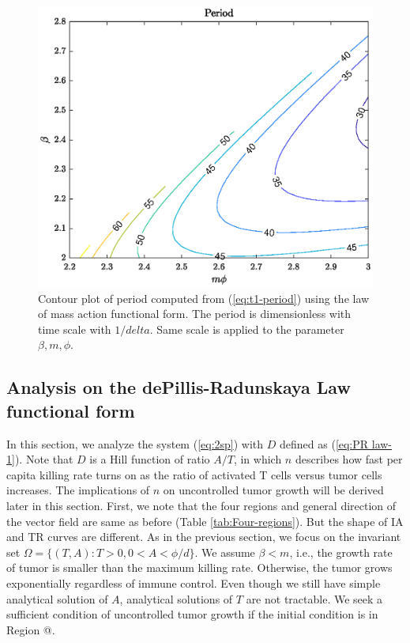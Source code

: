 \documentclass[review,authoryear]{elsarticle}
\makeatletter
\newcommand*{\rom}[1]{\expandafter\@slowromancap\romannumeral #1@}
\makeatother
\begin{document}
\begin{figure}
\includegraphics[width=0.9\linewidth]{figs/DA-period-contour}
\caption{\label{fig:Contour-plot-of-period}Contour plot of period computed
from (\ref{eq:t1-period}) using the law of mass action functional form. The period is dimensionless with time scale
with $1/delta$. Same scale is applied to the parameter $\beta,m,\phi$. }
\end{figure}


\subsection{Analysis on the dePillis-Radunskaya Law functional form}

In this section, we analyze the system (\ref{eq:2sp}) with $D$
defined as (\ref{eq:PR law-1}). Note that $D$ is a Hill
function of ratio $A/T$, in which $n$ describes how fast per capita
killing rate turns on as the ratio of activated T cells versus tumor cells increases.
The implications of $n$ on uncontrolled tumor growth will be derived later in this section.
First, we note that the four regions and general direction of the vector field are same as before (Table \ref{tab:Four-regions}). But the shape of IA and TR curves are different. As in the previous section, we focus on the
invariant set $\Omega=\{(T,A):T>0,0<A<\phi/d\}$. We assume $\beta<m$, i.e.,
the growth rate of tumor is smaller than the maximum killing rate.
Otherwise, the tumor grows exponentially regardless of immune control.
Even though we still have simple analytical solution of $A$, analytical
solutions of $T$ are not tractable. We seek a sufficient condition
of uncontrolled tumor growth if the initial condition is in Region \rom{2}. 
\end{document}
